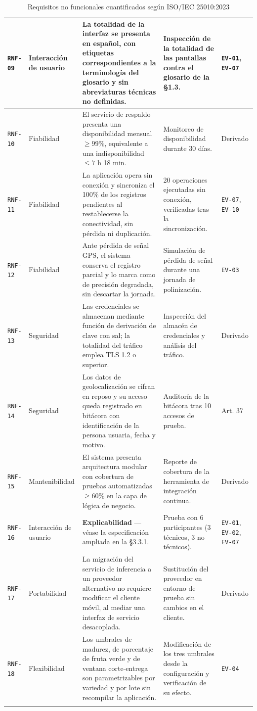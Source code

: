 \documentclass[11pt,a4paper]{article}
\newcommand{\id}[1]{\texttt{\begingroup\hyphenpenalty=10000\relax#1\endgroup}}
\renewcommand{\id}[1]{\texttt{#1}}
\begin{document}
{\begin{longtable}{|C{1.2cm}|L{2.4cm}|L{5.8cm}|L{3.1cm}|L{2.2cm}|}
\id{RNF-09} & Interacción de usuario & La totalidad de la interfaz se presenta en español, con etiquetas correspondientes a la terminología del glosario y sin abreviaturas técnicas no definidas. & Inspección de la totalidad de las pantallas contra el glosario de la §1.3. & \id{EV-01}, \id{EV-07} \\ \hline
\id{RNF-10} & Fiabilidad & El servicio de respaldo presenta una disponibilidad mensual $\geq 99\%$, equivalente a una indisponibilidad $\leq 7$ h 18 min. & Monitoreo de disponibilidad durante 30 días. & \footnotesize Derivado \\ \hline
\id{RNF-11} & Fiabilidad & La aplicación opera sin conexión y sincroniza el 100\% de los registros pendientes al restablecerse la conectividad, sin pérdida ni duplicación. & 20 operaciones ejecutadas sin conexión, verificadas tras la sincronización. & \id{EV-07}, \id{EV-10} \\ \hline
\id{RNF-12} & Fiabilidad & Ante pérdida de señal GPS, el sistema conserva el registro parcial y lo marca como de precisión degradada, sin descartar la jornada. & Simulación de pérdida de señal durante una jornada de polinización. & \footnotesize \id{EV-03} \\ \hline
\id{RNF-13} & Seguridad & Las credenciales se almacenan mediante función de derivación de clave con sal; la totalidad del tráfico emplea TLS 1.2 o superior. & Inspección del almacén de credenciales y análisis del tráfico. & \footnotesize Derivado \\ \hline
\id{RNF-14} & Seguridad & Los datos de geolocalización se cifran en reposo y su acceso queda registrado en bitácora con identificación de la persona usuaria, fecha y motivo. & Auditoría de la bitácora tras 10 accesos de prueba. & \footnotesize \cite{lopdp} Art. 37 \\ \hline
\id{RNF-15} & Mantenibilidad & El sistema presenta arquitectura modular con cobertura de pruebas automatizadas $\geq 60\%$ en la capa de lógica de negocio. & Reporte de cobertura de la herramienta de integración continua. & \footnotesize Derivado \\ \hline
{}\id{RNF-16} & Interacción de usuario & \textbf{Explicabilidad} --- véase la especificación ampliada en la §3.3.1. & Prueba con 6 participantes (3 técnicos, 3 no técnicos). & \footnotesize \id{EV-01}, \id{EV-02}, \id{EV-07} \\ \hline
\id{RNF-17} & Portabilidad & La migración del servicio de inferencia a un proveedor alternativo no requiere modificar el cliente móvil, al mediar una interfaz de servicio desacoplada. & Sustitución del proveedor en entorno de prueba sin cambios en el cliente. & \footnotesize Derivado \\ \hline
\id{RNF-18} & Flexibilidad & Los umbrales de madurez, de porcentaje de fruta verde y de ventana corte-entrega son parametrizables por variedad y por lote sin recompilar la aplicación. & Modificación de los tres umbrales desde la configuración y verificación de su efecto. & \footnotesize \id{EV-04} \\ \hline
\caption{Requisitos no funcionales cuantificados según ISO/IEC 25010:2023}
\end{longtable}}
\end{document}
